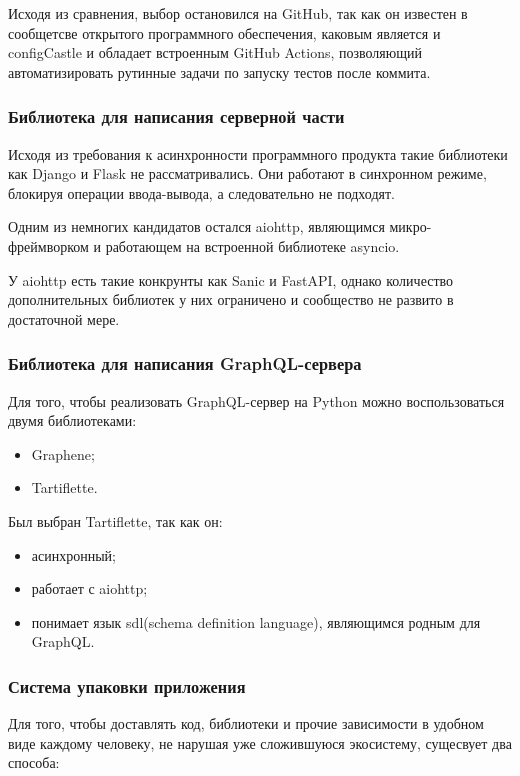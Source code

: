 Исходя из сравнения, выбор остановился на GitHub, так как он известен в сообщетсве открытого программного обеспечения, каковым является и configCastle и обладает встроенным
GitHub Actions, позволяющий автоматизировать рутинные задачи по запуску тестов после коммита.

\subsubsection{Библиотека для написания серверной части}

Исходя из требования к асинхронности программного продукта такие библиотеки как Django и Flask не рассматривались. Они работают в синхронном режиме, блокируя операции
ввода-вывода, а следовательно не подходят.

Одним из немногих кандидатов остался aiohttp, являющимся микро-фреймворком и работающем на встроенной библиотеке asyncio.

У aiohttp есть такие конкрунты как Sanic и FastAPI, однако количество дополнительных библиотек у них ограничено и сообщество не развито в достаточной мере.

\subsubsection{Библиотека для написания GraphQL-сервера}

Для того, чтобы реализовать GraphQL-сервер на Python можно воспользоваться двумя библиотеками:

\begin{itemize}
    \item Graphene;
    \item Tartiflette.
\end{itemize}

Был выбран Tartiflette, так как он:

\begin{itemize}
    \item асинхронный;
    \item работает с aiohttp;
    \item понимает язык sdl(schema definition language), являющимся родным для GraphQL.
\end{itemize}

\subsubsection{Система упаковки приложения}

Для того, чтобы доставлять код, библиотеки и прочие зависимости в удобном виде каждому человеку, не нарушая уже сложившуюся экосистему, сущесвует
два способа:

